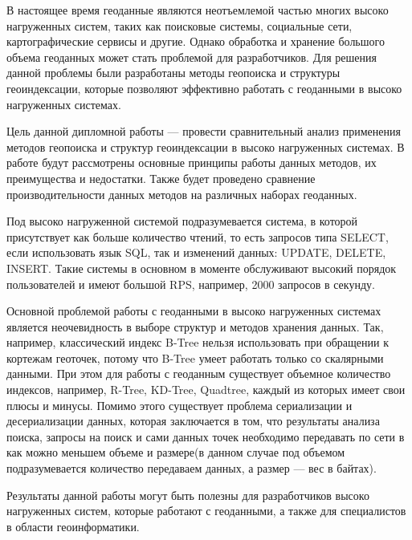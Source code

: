 \Introduction

В настоящее время геоданные являются неотъемлемой частью многих высоко нагруженных систем, таких как поисковые системы, социальные сети, картографические сервисы и другие. Однако обработка и хранение большого объема геоданных может стать проблемой для разработчиков. Для решения данной проблемы были разработаны методы геопоиска и структуры геоиндексации, которые позволяют эффективно работать с геоданными в высоко нагруженных системах.

Цель данной дипломной работы — провести сравнительный анализ применения методов геопоиска и структур геоиндексации в высоко нагруженных системах. В работе будут рассмотрены основные принципы работы данных методов, их преимущества и недостатки. Также будет проведено сравнение производительности данных методов на различных наборах геоданных.

Под высоко нагруженной системой подразумевается система, в которой присутствует как больше количество чтений, то есть запросов типа SELECT, если использовать язык SQL, так и изменений данных: UPDATE, DELETE, INSERT. Такие системы в основном в моменте обслуживают высокий порядок пользователей и имеют большой RPS, например, 2000 запросов в секунду.

Основной проблемой работы с геоданными в высоко нагруженных системах является неочевидность в выборе структур и методов хранения данных. Так, например, классический индекс B-Tree нельзя использовать при обращении к кортежам геоточек, потому что B-Tree умеет работать только со скалярными данными. При этом для работы с геоданным существует объемное количество индексов, например, R-Tree, KD-Tree, Quadtree, каждый из которых имеет свои плюсы и минусы. Помимо этого существует проблема сериализации и десериализации данных, которая заключается в том, что результаты анализа поиска, запросы на поиск и сами данных точек необходимо передавать по сети в как можно меньшем объеме и размере(в данном случае под объемом подразумевается количество передаваем данных, а размер — вес в байтах).

Результаты данной работы могут быть полезны для разработчиков высоко нагруженных систем, которые работают с геоданными, а также для специалистов в области геоинформатики.
